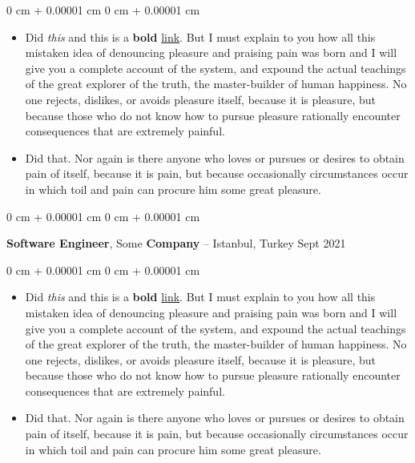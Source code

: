 \documentclass[10pt, letterpaper]{article}
\newenvironment{highlights}{
    \begin{itemize}[
        topsep=0.10 cm,
        parsep=0.10 cm,
        partopsep=0pt,
        itemsep=0pt,
        leftmargin=0 cm + 10pt
    ]
}{
    \end{itemize}
} %
\newenvironment{onecolentry}{
    \begin{adjustwidth}{
        0 cm + 0.00001 cm
    }{
        0 cm + 0.00001 cm
    }
}{
    \end{adjustwidth}
} %
\newenvironment{twocolentry}[2][]{
    \onecolentry
    \def\secondColumn{#2}
    \setcolumnwidth{\fill, 4.5 cm}
    \begin{paracol}{2}
}{
    \switchcolumn \raggedleft \secondColumn
    \end{paracol}
    \endonecolentry
} %
\begin{document}
        \vspace{0.10 cm}
        \begin{onecolentry}
            \begin{highlights}
                \item Did \textit{this} and this is a \textbf{bold} \href{https://example.com}{link}. But I must explain to you how all this mistaken idea of denouncing pleasure and praising pain was born and I will give you a complete account of the system, and expound the actual teachings of the great explorer of the truth, the master-builder of human happiness. No one rejects, dislikes, or avoids pleasure itself, because it is pleasure, but because those who do not know how to pursue pleasure rationally encounter consequences that are extremely painful.
                \item Did that. Nor again is there anyone who loves or pursues or desires to obtain pain of itself, because it is pain, but because occasionally circumstances occur in which toil and pain can procure him some great pleasure.
            \end{highlights}
        \end{onecolentry}


        \vspace{0.2 cm}

        \begin{twocolentry}{
            Sept 2021
        }
            \textbf{Software Engineer}, Some \textbf{Company} -- Istanbul, Turkey\end{twocolentry}

        \vspace{0.10 cm}
        \begin{onecolentry}
            \begin{highlights}
                \item Did \textit{this} and this is a \textbf{bold} \href{https://example.com}{link}. But I must explain to you how all this mistaken idea of denouncing pleasure and praising pain was born and I will give you a complete account of the system, and expound the actual teachings of the great explorer of the truth, the master-builder of human happiness. No one rejects, dislikes, or avoids pleasure itself, because it is pleasure, but because those who do not know how to pursue pleasure rationally encounter consequences that are extremely painful.
                \item Did that. Nor again is there anyone who loves or pursues or desires to obtain pain of itself, because it is pain, but because occasionally circumstances occur in which toil and pain can procure him some great pleasure.
            \end{highlights}
        \end{onecolentry}
\end{document}
